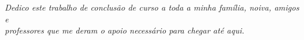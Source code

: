 \begin{Dedicatoria}
   \vspace*{\fill}
   \centering
   \noindent
   \textit{Dedico este trabalho de conclusão de curso a toda a minha família, noiva, amigos e \\
   professores que me deram o apoio necessário para chegar até aqui.} \vspace*{\fill}
\end{Dedicatoria}
